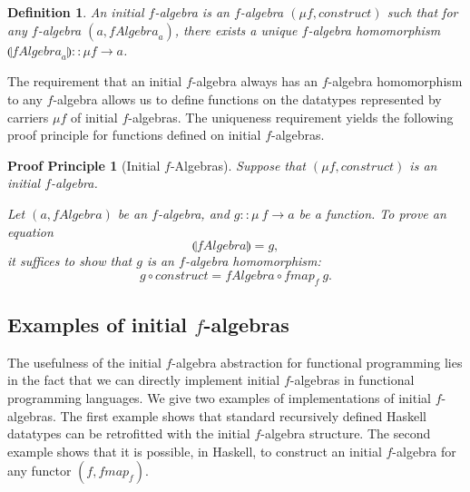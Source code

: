\documentclass{jfp1}
\newcommand{\fold}[1]{\llparenthesis #1 \rrparenthesis}
\newtheorem{definition}{Definition}
\newtheorem{proofprinciple}{Proof Principle}
\begin{document}
\begin{definition}
  An \emph{initial $f$-algebra} is an $f$-algebra $(\mu f,
  \mathit{construct})$ such that for any $f$-algebra $(a,
  \mathit{fAlgebra}_a)$, there exists a unique $f$-algebra
  homomorphism $\fold{\mathit{fAlgebra}_a} :: \mu f \to a$.
\end{definition}

The requirement that an initial $f$-algebra always has an $f$-algebra
homomorphism to any $f$-algebra allows us to define functions on the
datatypes represented by carriers $\mu f$ of initial $f$-algebras. The
uniqueness requirement yields the following proof principle for
functions defined on initial $f$-algebras.

\begin{proofprinciple}[Initial $f$-Algebras]\label{pp:initial-alg}
  Suppose that $(\mu f, \mathit{construct})$ is an initial $f$-algebra.

  Let $(a, \mathit{fAlgebra})$ be an $f$-algebra, and $g :: \mu~f \to
  a$ be a function. To prove an equation
  \begin{displaymath}
    \fold{\mathit{fAlgebra}} = g,
  \end{displaymath}
  it suffices to show that $g$ is an $f$-algebra homomorphism:
  \begin{displaymath}
    g \circ \mathit{construct} = \mathit{fAlgebra} \circ \mathit{fmap}_f~g.
  \end{displaymath}
\end{proofprinciple}


\subsection{Examples of initial $f$-algebras}

The usefulness of the initial $f$-algebra abstraction for functional
programming lies in the fact that we can directly implement initial
$f$-algebras in functional programming languages. We give two examples
of implementations of initial $f$-algebras. The first example shows
that standard recursively defined Haskell datatypes can be retrofitted
with the initial $f$-algebra structure. The second example shows that
it is possible, in Haskell, to construct an initial $f$-algebra for
any functor $(f,\mathit{fmap_f})$.
\end{document}
